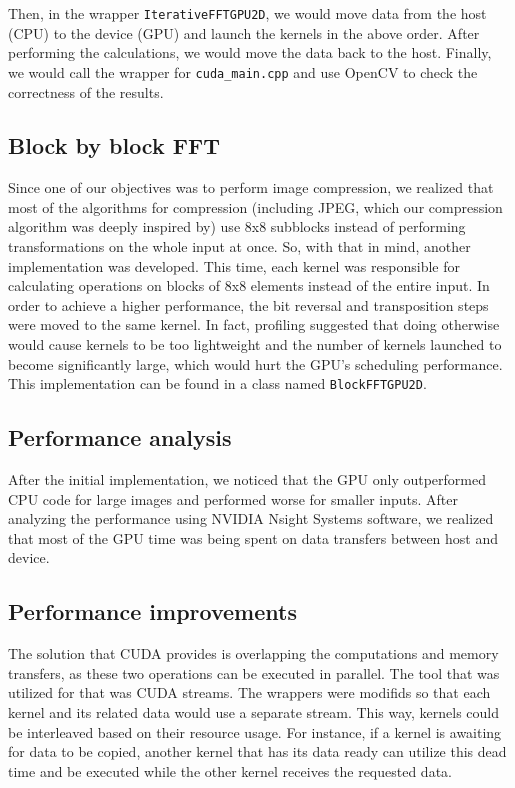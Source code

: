 Then, in the wrapper \texttt{IterativeFFTGPU2D}, we would move data from the host (CPU) to the device (GPU) and launch the kernels in the above order. After performing the calculations, we would move the data back to the host. Finally, we would call the wrapper for \texttt{cuda\_main.cpp} and use OpenCV to check the correctness of the results.

\subsection{Block by block FFT}
Since one of our objectives was to perform image compression, we realized that most of the algorithms for compression (including JPEG, which our compression algorithm was deeply inspired by) use 8x8 subblocks instead of performing transformations on the whole input at once. So, with that in mind, another implementation was developed. This time, each kernel was responsible for calculating operations on blocks of 8x8 elements instead of the entire input. In order to achieve a higher performance, the bit reversal and transposition steps were moved to the same kernel. In fact, profiling suggested that doing otherwise would cause kernels to be too lightweight and the number of kernels launched to become significantly large, which would hurt the GPU's scheduling performance. This implementation can be found in a class named \texttt{BlockFFTGPU2D}.

\subsection{Performance analysis}
After the initial implementation, we noticed that the GPU only outperformed CPU code for large images and performed worse for smaller inputs. After analyzing the performance using NVIDIA Nsight Systems software, we realized that most of the GPU time was being spent on data transfers between host and device. 

\subsection{Performance improvements}
The solution that CUDA provides is overlapping the computations and memory transfers, as these two operations can be executed in parallel. The tool that was utilized for that was CUDA streams. The wrappers were modifids so that each kernel and its related data would use a separate stream. This way, kernels could be interleaved based on their resource usage. For instance, if a kernel is awaiting for data to be copied, another kernel that has its data ready can utilize this dead time and be executed while the other kernel receives the requested data.

